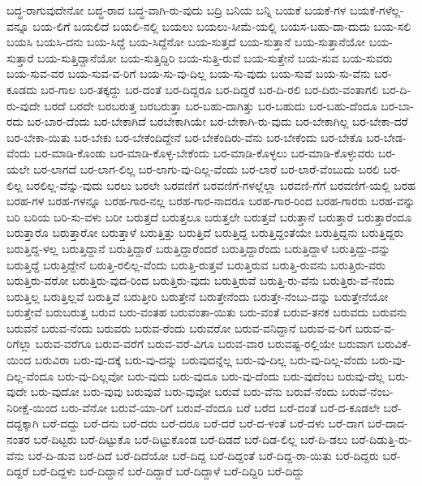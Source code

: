 {ಬದ್ಧ-ರಾಗುವುದೇನೋ
ಬದ್ಧ-ರಾದ
ಬದ್ಧ-ವಾಗಿ-ರು-ವುದು
ಬದ್ರಿ
ಬನಿಯ
ಬನ್ನಿ
ಬಯಕೆ
ಬಯಕೆ-ಗಳ
ಬಯಕೆ-ಗಳೆಲ್ಲ-ವನ್ನೂ
ಬಯ-ಲಿಗೆ
ಬಯಲಿದೆ
ಬಯಲಿ-ನಲ್ಲಿ
ಬಯಲು
ಬಯಲು-ಸೀಮೆ-ಯಲ್ಲಿ
ಬಯಸ-ಬಹು-ದಾ-ದುದು
ಬಯ-ಸಲಿ
ಬಯಸಿ
ಬಯಸಿ-ದನು
ಬಯ-ಸಿದ್ದೆ
ಬಯ-ಸಿದ್ದೆನೋ
ಬಯ-ಸುತ್ತದೆ
ಬಯ-ಸುತ್ತಾನೆ
ಬಯ-ಸುತ್ತಾನೆಯೋ
ಬಯ-ಸುತ್ತಾರೆ
ಬಯ-ಸುತ್ತಿದ್ದಾನೆಯೋ
ಬಯ-ಸುತ್ತಿದ್ದಿರಿ
ಬಯ-ಸುತ್ತಿ-ರುವೆ
ಬಯ-ಸುತ್ತೇನೆ
ಬಯ-ಸುವ
ಬಯ-ಸುವರು
ಬಯ-ಸುವ-ವರ
ಬಯ-ಸುವ-ವ-ರಿಗೆ
ಬಯ-ಸು-ವು-ದಿಲ್ಲ
ಬಯ-ಸು-ವುದು
ಬಯ-ಸುವೆ
ಬಯ-ಸು-ವೆನು
ಬರ-ಕೂಡದು
ಬರ-ಗಾಲ
ಬರ-ತಕ್ಕದ್ದು
ಬರ-ದಂತೆ
ಬರ-ದಿದ್ದರೂ
ಬರ-ದಿದ್ದರೆ
ಬರ-ದಿ-ರಲಿ
ಬರ-ದಿರು-ವಂತಾಗಲಿ
ಬರ-ದಿ-ರು-ವುದೇ
ಬರದೆ
ಬರದೇ
ಬರಬರುತ್ತ
ಬರಬರುತ್ತಾ
ಬರ-ಬಹು-ದಾಗಿತ್ತು
ಬರ-ಬಹುದು
ಬರ-ಬಹು-ದೆಂದೂ
ಬರ-ಬಾ-ರದು
ಬರ-ಬಾರ-ದೆಂದು
ಬರ-ಬೇಕಾಗಿದೆ
ಬರಬೇಕಾಗಿಯೇ
ಬರ-ಬೇಕಾಗಿ-ರು-ವುದು
ಬರ-ಬೇಕಾಗಿಲ್ಲ
ಬರ-ಬೇಕಾ-ದರೆ
ಬರ-ಬೇಕಾ-ಯಿತು
ಬರ-ಬೇಕು
ಬರ-ಬೇಕೆಂದಿದ್ದೇನೆ
ಬರ-ಬೇಕೆಂದಿರು-ವೆನು
ಬರ-ಬೇಕೆಂದು
ಬರ-ಬೇಕೊ
ಬರ-ಬೇಡ-ವೆಂದು
ಬರ-ಮಾಡಿ-ಕೊಂಡು
ಬರ-ಮಾಡಿ-ಕೊಳ್ಳ-ಬೇಕೆಂದು
ಬರ-ಮಾಡಿ-ಕೊಳ್ಳಲು
ಬರ-ಮಾಡಿ-ಕೊಳ್ಳುವರು
ಬರ-ಯಲೇ
ಬರ-ಲಾಗದೆ
ಬರ-ಲಾಗ-ಲಿಲ್ಲ
ಬರ-ಲಾಗು-ವು-ದಿಲ್ಲ-ವೆಂದು
ಬರ-ಲಾರೆ
ಬರ-ಲಾರೆ-ವೆಂಬುದು
ಬರಲಿ
ಬರ-ಲಿಲ್ಲ
ಬರಲಿಲ್ಲ-ವೆನ್ನು-ವುದು
ಬರಲು
ಬರಲೇ
ಬರವಣಿಗೆ
ಬರವಣಿಗೆ-ಗಳಲ್ಲೆಲ್ಲಾ
ಬರವಣಿ-ಗೆಗೆ
ಬರವಣಿಗೆ-ಯಲ್ಲಿ
ಬರಹ
ಬರಹ-ಗಳ
ಬರಹ-ಗಳನ್ನೂ
ಬರಹ-ಗಾರ-ನಲ್ಲ
ಬರಹ-ಗಾರ-ನಾದರೂ
ಬರಹ-ಗಾರ-ರಿಂದ
ಬರಹ-ಗಾರರು
ಬರಹ-ವನ್ನು
ಬರಿ
ಬರಿಯ
ಬರಿ-ಸು-ವಳು
ಬರೀ
ಬರುತ್ತದೆ
ಬರುತ್ತಲೂ
ಬರುತ್ತಲೇ
ಬರುತ್ತವೆ
ಬರುತ್ತಾನೆ
ಬರುತ್ತಾರೆ
ಬರುತ್ತಾರೆಂದೂ
ಬರುತ್ತಾರೊ
ಬರುತ್ತಾರೋ
ಬರುತ್ತಾಳೆ
ಬರುತ್ತಿತ್ತು
ಬರುತ್ತಿದೆ
ಬರುತ್ತಿದ್ದ
ಬರುತ್ತಿದ್ದಂತೆಯೇ
ಬರುತ್ತಿದ್ದನು
ಬರುತ್ತಿದ್ದರು
ಬರುತ್ತಿದ್ದ-ಳಲ್ಲ
ಬರುತ್ತಿದ್ದಾನೆ
ಬರುತ್ತಿದ್ದಾರೆ
ಬರುತ್ತಿದ್ದಾರೆಂದರೆ
ಬರುತ್ತಿದ್ದಾರೆಂದು
ಬರುತ್ತಿದ್ದಾಳೆ
ಬರುತ್ತಿದ್ದು-ದನ್ನು
ಬರುತ್ತಿದ್ದೆ
ಬರುತ್ತಿದ್ದೇನೆ
ಬರುತ್ತಿ-ರಲಿಲ್ಲ-ವೆಂದು
ಬರುತ್ತಿ-ರುತ್ತವೆ
ಬರುತ್ತಿರುವ
ಬರುತ್ತಿ-ರುವನು
ಬರುತ್ತಿರು-ವರು
ಬರುತ್ತಿರು-ವರೋ
ಬರುತ್ತಿರು-ವುದ-ರಿಂದ
ಬರುತ್ತಿರು-ವುದು
ಬರುತ್ತಿರುವೆ
ಬರುತ್ತಿ-ರು-ವೆನು
ಬರುತ್ತಿರು-ವೆ-ನೆಂದು
ಬರುತ್ತಿಲ್ಲ
ಬರುತ್ತಿಲ್ಲವೆ
ಬರುತ್ತಿವೆ
ಬರುತ್ತೀರಿ
ಬರುತ್ತೇನೆ
ಬರುತ್ತೇನೆಂದು
ಬರುತ್ತೇ-ನೆಂಬು-ದನ್ನು
ಬರುತ್ತೇನೆಯೋ
ಬರುತ್ತೇವೆ
ಬರುಬರುತ್ತ
ಬರುವ
ಬರು-ವಂತಹ
ಬರುವಂತಾ-ಯಿತು
ಬರು-ವಂತೆ
ಬರುವ-ತನಕ
ಬರುವದು
ಬರುವನು
ಬರುವನೆ
ಬರುವ-ನೆಂದು
ಬರುವರು
ಬರುವ-ರೆಂದು
ಬರುವರೋ
ಬರುವ-ವನಿದ್ದಾನೆ
ಬರುವ-ವ-ರಿಗೆ
ಬರುವ-ವ-ರಿಗೆಲ್ಲಾ
ಬರುವ-ವರೆಗೂ
ಬರುವ-ವರೆಗೆ
ಬರುವ-ವರೆ-ವಿಗೂ
ಬರುವ-ವಾರ
ಬರುವಷ್ಟ-ರಲ್ಲಿಯೇ
ಬರುವಾಗ
ಬರುವಿಕೆ-ಯಿಂದ
ಬರುವಿರಾ
ಬರು-ವು-ದಕ್ಕೆ
ಬರು-ವು-ದನ್ನು
ಬರುವುದನ್ನೆಲ್ಲ
ಬರು-ವು-ದಿಲ್ಲ
ಬರು-ವು-ದಿಲ್ಲ-ವೆಂದು
ಬರು-ವು-ದಿಲ್ಲ-ವೆಂದೂ
ಬರು-ವು-ದಿಲ್ಲವೋ
ಬರು-ವುದು
ಬರು-ವುದೂ
ಬರು-ವು-ದೆಂದು
ಬರು-ವುದೆಂಬ
ಬರುವು-ದೆಲ್ಲ
ಬರು-ವುದೇ
ಬರು-ವುದೋ
ಬರು-ವುವು
ಬರುವುವೆ
ಬರು-ವುವೋ
ಬರುವೆ
ಬರು-ವೆನು
ಬರುವೆ-ನೆಂದು
ಬರುವೆ-ನೆಂಬ-ನಿರೀಕ್ಷೆ-ಯಿಂದ
ಬರು-ವೆನೋ
ಬರುವೆ-ಯಾ-ರಿಗೆ
ಬರುವೆ-ವೆಂದೂ
ಬರೆ
ಬರೆದ
ಬರೆ-ದಂತೆ
ಬರೆ-ದ-ಕೂಡಲೇ
ಬರೆ-ದದ್ದಕ್ಕಾಗಿ
ಬರೆ-ದದ್ದು
ಬರೆ-ದನು
ಬರೆ-ದರು
ಬರೆ-ದರೂ
ಬರೆ-ದರೆ
ಬರೆ-ದ-ಳಂತೆ
ಬರೆ-ದಳು
ಬರೆ-ದಾಗ
ಬರೆ-ದಾದ-ನಂತರ
ಬರೆ-ದಿಟ್ಟರು
ಬರೆ-ದಿಟ್ಟುಕೊ
ಬರೆ-ದಿಟ್ಟುಕೊಂಡ
ಬರೆ-ದಿಡದೆ
ಬರೆ-ದಿಡ-ಲಿಲ್ಲ
ಬರೆ-ದಿ-ಡಲು
ಬರೆ-ದಿಡುತ್ತಿ-ರು-ವೆನು
ಬರೆ-ದಿ-ಡುವ
ಬರೆ-ದಿದೆ
ಬರೆ-ದಿದೆಯೋ
ಬರೆ-ದಿದ್ದ
ಬರೆ-ದಿದ್ದಂತೆ
ಬರೆ-ದಿದ್ದ-ರಾ-ಯಿತು
ಬರೆ-ದಿದ್ದರು
ಬರೆ-ದಿದ್ದರೆ
ಬರೆ-ದಿದ್ದಳು
ಬರೆ-ದಿದ್ದಾನೆ
ಬರೆ-ದಿದ್ದಾರೆ
ಬರೆ-ದಿದ್ದಾಳೆ
ಬರೆ-ದಿದ್ದಿರಿ
ಬರೆ-ದಿದ್ದು
}
